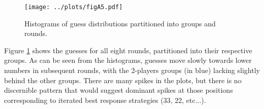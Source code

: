 \begin{figure}
\texttt{[image: ../plots/figA5.pdf]}\caption{Histograms of guess distributions partitioned into groups and rounds.}
\label{Fig S5}
\end{figure}

Figure \ref{Fig S5} shows the guesses for all eight rounds, partitioned into their respective groups. As can be seen from the histograms, guesses move slowly towards lower numbers in subsequent rounds, with the 2-players groups (in blue) lacking slightly behind the other groups. There are many spikes in the plots, but there is no discernible pattern that would suggest dominant spikes at those positions corresponding to iterated best response strategies (33, 22, etc...).


%
%


